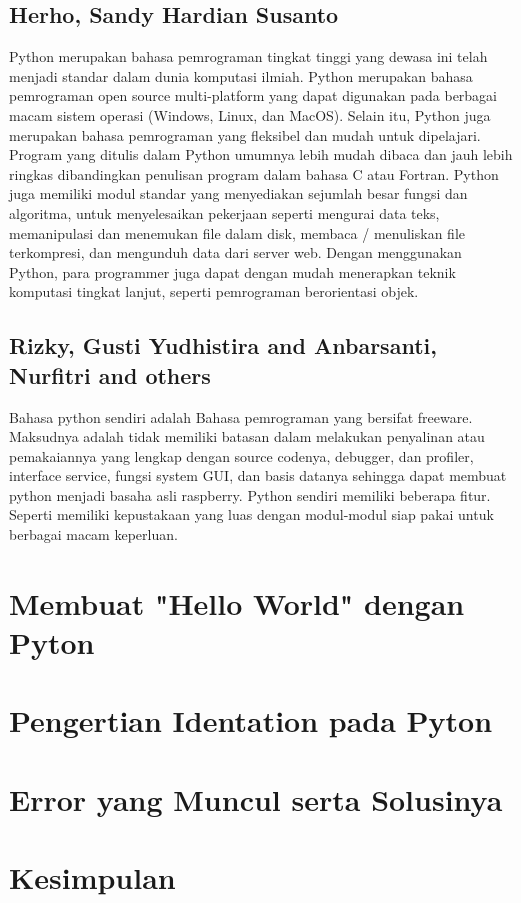 \documentclass[12pt]{article}
\begin{document}
\subsection{Herho, Sandy Hardian Susanto}
Python merupakan bahasa pemrograman tingkat tinggi yang dewasa ini telah menjadi standar dalam dunia komputasi ilmiah. Python merupakan bahasa pemrograman open source multi-platform yang dapat digunakan pada berbagai macam sistem operasi (Windows, Linux, dan MacOS). Selain itu, Python juga merupakan bahasa pemrograman yang fleksibel dan mudah untuk dipelajari. Program yang ditulis dalam Python umumnya lebih mudah dibaca dan jauh lebih ringkas dibandingkan penulisan program dalam bahasa C atau Fortran. Python juga memiliki modul standar yang menyediakan sejumlah besar fungsi dan algoritma, untuk menyelesaikan pekerjaan seperti mengurai data teks, memanipulasi dan menemukan file dalam disk, membaca / menuliskan file terkompresi, dan mengunduh data dari server web. Dengan menggunakan Python, para programmer juga dapat dengan mudah menerapkan teknik komputasi tingkat lanjut, seperti pemrograman berorientasi objek\cite{herho2018tutorial}.

\subsection{Rizky, Gusti Yudhistira and Anbarsanti, Nurfitri and others}
Bahasa python sendiri adalah Bahasa pemrograman yang bersifat freeware. Maksudnya adalah tidak memiliki batasan dalam melakukan penyalinan atau pemakaiannya yang lengkap dengan source codenya, debugger, dan profiler, interface service, fungsi system GUI, dan basis datanya sehingga dapat membuat python menjadi basaha asli raspberry. Python sendiri memiliki beberapa fitur. Seperti memiliki kepustakaan yang luas dengan modul-modul siap pakai untuk berbagai macam keperluan\cite{rizky2016desain}. 

\section{Membuat "Hello World" dengan Pyton}


\section{Pengertian Identation pada Pyton}


\section{Error yang Muncul serta Solusinya}


\section{Kesimpulan}
\end{document}
